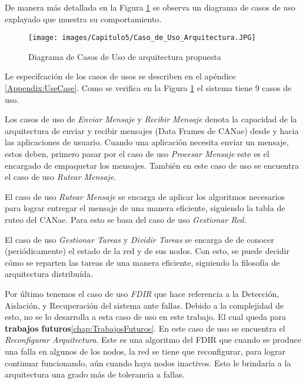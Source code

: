 De manera más detallada en la Figura \ref{fig:DiagramaCUArqPropuesta} se
observa un diagrama de casos de uso explayado que muestra su comportamiento.

\begin{figure}[h!]
 \centering
 \texttt{[image: images/Capitulo5/Caso\_de\_Uso\_Arquitectura.JPG]}
  \caption{Diagrama de Casos de Uso de arquitectura propuesta}
\label{fig:DiagramaCUArqPropuesta}
\end{figure} 

Le especifcación de los casos de usos se describen en el apéndice \ref{Appendix:UseCase}.
Como se verifica en la Figura \ref{fig:DiagramaCUArqPropuesta}
el sistema tiene 9 casos de uso.

Los casos de uso de \textit{Enviar Mensaje} y \textit{Recibir Mensaje} denota la
capacidad de la arquitectura de enviar y recibir mensajes (Data Frames de
CANae) desde y hacia las aplicaciones de usuario. Cuando una aplicación
necesita enviar un mensaje, estos deben, primero pasar por el caso de uso
\textit{Procesar Mensaje} este es el encargado de empaquetar los mensajes.
También en este caso de uso se encuentra el caso de uso \textit{Rutear
  Mensaje}.

El caso de uso \textit{Rutear Mensaje} se encarga de aplicar los algoritmos
necesarios para lograr entregar el mensaje de una manera eficiente, siguiendo
la tabla de ruteo del CANae. Para esto se basa del caso de uso \textit{Gestionar
  Red}.

El caso de uso \textit{Gestionar Tareas} y \textit{Dividir Tareas} se encarga de
de conocer (periódicamente) el estado de la red y de sus nodos. Con esto, se puede
decidir cómo se reparten las tareas de una manera eficiente, siguiendo
la filosofía de arquitectura distribuída.

Por último tenemos el caso de uso \textit{FDIR} que hace referencia a la
Detección, Aislación, y Recuperación del sistema ante fallas. Debido a la
complejidad de esto, no se lo desarrolla a esta caso de uso en este trabajo.
El cual queda para \textbf{trabajos futuros}\ref{chap:TrabajosFuturos}. En este
caso de uso se encuentra el \textit{Reconfigurar Arquitectura}. Este es una
algoritmo del \ac{FDIR} que cuando se produce una falla en algunos de los
nodos, la red se tiene que reconfigurar, para lograr continuar funcionando,
aún cuando haya nodos inactivos. Esto le brindaría a la arquitectura una grado
más de tolerancia a fallas. 




